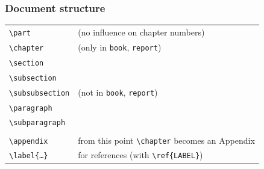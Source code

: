 \documentclass{beamer}
\begin{document}
\begin{frame}[fragile]
  \frametitle{Document structure}
  
  \begin{center}
  \begin{tabular}{ll}
    \verb?\part? & (no influence on chapter numbers) \\
    \verb?\chapter? & (only in \texttt{book}, \texttt{report}) \\
    \verb?\section? & \\
    \verb?\subsection? & \\
    \verb?\subsubsection? & (not in \texttt{book}, \texttt{report}) \\ 
    \verb?\paragraph? & \\
    \verb?\subparagraph? & \\
    &\\
    \verb?\appendix? & from this point \verb?\chapter? becomes an Appendix \\
    \verb?\label{?\texttt{\ldots}\verb?}? & for references (with \verb|\ref{LABEL}|)
  \end{tabular}
  \end{center}
\end{frame}
\end{document}
